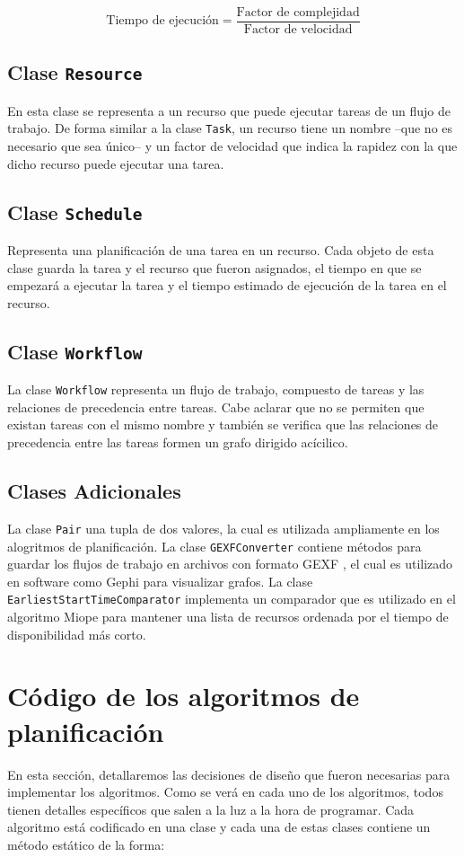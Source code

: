 \begin{equation}
\text{Tiempo de ejecución} = \frac{\text{Factor de complejidad}}{\text{Factor de velocidad}}
\end{equation}

\subsection{Clase \texttt{Resource}}
En esta clase se representa a un recurso que puede ejecutar tareas de un flujo de trabajo. De forma similar a la clase \texttt{Task}, un recurso tiene un nombre --que no es necesario que sea único-- y un factor de velocidad que indica la rapidez con la que dicho recurso puede ejecutar una tarea.

\subsection{Clase \texttt{Schedule}}
Representa una planificación de una tarea en un recurso. Cada objeto de esta clase guarda la tarea y el recurso que fueron asignados, el tiempo en que se empezará a ejecutar la tarea y el tiempo estimado de ejecución de la tarea en el recurso.

\subsection{Clase \texttt{Workflow}}
La clase \texttt{Workflow} representa un flujo de trabajo, compuesto de tareas y las relaciones de precedencia entre tareas. Cabe aclarar que no se permiten que existan tareas con el mismo nombre y también se verifica que las relaciones de precedencia entre las tareas formen un grafo dirigido acícilico.

\subsection{Clases Adicionales}
La clase \texttt{Pair} una tupla de dos valores, la cual es utilizada ampliamente en los alogritmos de planificación. La clase \texttt{GEXFConverter} contiene métodos para guardar los flujos de trabajo en archivos con formato GEXF \cite{gexf2014}, el cual es utilizado en software como Gephi \cite{bastian2009gephi} para visualizar grafos. La clase \texttt{EarliestStartTimeComparator} implementa un comparador que es utilizado en el algoritmo Miope para mantener una lista de recursos ordenada por el tiempo de disponibilidad más corto.

\section{Código de los algoritmos de planificación}
En esta sección, detallaremos las decisiones de diseño que fueron necesarias para implementar los algoritmos. Como se verá en cada uno de los algoritmos, todos tienen detalles específicos que salen a la luz a la hora de programar. Cada algoritmo está codificado en una clase y cada una de estas clases contiene un método estático de la forma:

